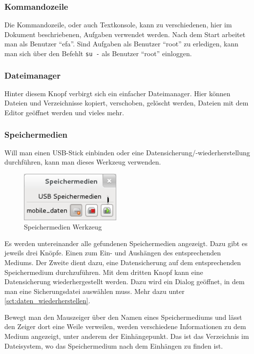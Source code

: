 \documentclass[a4paper,12pt,twoside]{article}
\begin{document}
\subsubsection{Kommandozeile}
\label{sct:kommandozeile}
Die Kommandozeile, oder auch Textkonsole, kann zu verschiedenen, hier im
Dokument beschriebenen, Aufgaben verwendet werden. Nach dem Start
arbeitet man als Benutzer "`efa"'. Sind
Aufgaben als Benutzer "`root"' zu erledigen,
kann man sich über den Befehlt \texttt{su -} als
Benutzer "`root"' einloggen.


\subsubsection{Dateimanager}
\label{sct:dateimanager}
Hinter diesem Knopf verbirgt sich ein einfacher Dateimanager. Hier
können Dateien und Verzeichnisse kopiert, verschoben, gelöscht werden,
Dateien mit dem Editor geöffnet werden und vieles mehr.


\subsubsection{Speichermedien}
\label{sct:dialog_speichermedien}
Will man einen USB-Stick einbinden
oder eine Datensicherung/-wiederherstellung durchführen, kann man
dieses Werkzeug verwenden.

\begin{figure}
    \centering
    \includegraphics[width=5cm]{screenshots/efaLivede-img20.png}
    \caption{Speichermedien Werkzeug}
    \label{fig:dialog_speichermedien}
\end{figure}

Es werden untereinander alle gefundenen Speichermedien angezeigt. Dazu
gibt es jeweils drei Knöpfe. Einen zum Ein- und Aushängen des
entsprechenden Mediums. Der Zweite dient dazu, eine Datensicherung auf
dem entsprechenden Speichermedium durchzuführen. Mit dem dritten Knopf
kann eine Datensicherung wiederhergestellt werden. Dazu wird ein Dialog
geöffnet, in dem man eine Sicherungsdatei auswählen muss. Mehr dazu unter
\ref{sct:daten_wiederherstellen}.

Bewegt man den Mauszeiger über den Namen eines Speichermediums und lässt
den Zeiger dort eine Weile verweilen, werden verschiedene Informationen
zu dem Medium angezeigt, unter anderem der Einhängepunkt. Das ist das
Verzeichnis im Dateisystem, wo das Speichermedium nach dem Einhängen zu
finden ist.
\end{document}
